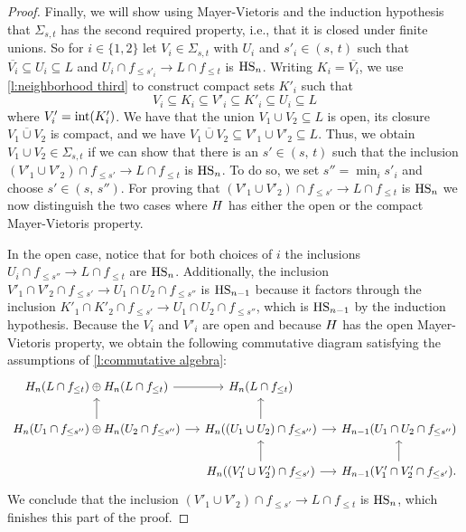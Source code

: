 \begin{proof}
	Finally, we will show using Mayer-Vietoris and the induction hypothesis that $\Sigma_{s,t}$ has the second required property, i.e., that it is closed under finite unions. 
	So for $i \in \{1, 2\}$ let $V_i \in \Sigma_{s,t}$ with $U_i$ and $s'_i \in (s,\, t)$ such that 
	$\overline{V_i} \subseteq U_i \subseteq L$ 
	and
	$U_{i} \cap f_{\leq s'_i} \to L \cap f_{\leq t}$
	is $\mathrm{HS}_n$.
	Writing $K_i = \overline{V_i}$, we use \cref{l:neighborhood third} to construct compact sets $K'_i$ such that
	\[V_i \subseteq K_i \subseteq V'_i \subseteq K'_i \subseteq U_i \subseteq L\]
	where $V'_i = \operatorname{int}(K'_i)$.
	We have that the union $V_1 \cup V_2 \subseteq L$ is open, its closure $\overline{V_1 \cup V_2}$ is compact, and we have $\overline{V_1 \cup V_2} \subseteq V'_1 \cup V'_2 \subseteq L$. 
	Thus, we obtain $V_1 \cup V_2 \in \Sigma_{s,t}$ if we can show that there is an $s' \in (s,\, t)$ such that the inclusion 
	$\left(V'_1 \cup V'_2 \right) \cap f_{\leq s'} \to L \cap f_{\leq t}$
	is $\mathrm{HS}_n$. 
	To do so, we set $s'' = \min_i s'_i$ and choose $s' \in (s,\, s'')$. 
	For proving that $\left(V'_1 \cup V'_2 \right) \cap f_{\leq s'} \to L \cap f_{\leq t}$ is $\mathrm{HS}_n$ we now distinguish the two cases where $H$ has either the open or the compact Mayer-Vietoris property. 
	
	In the open case, notice that for both choices of $i$ the inclusions
	$U_i \cap f_{\leq s''} \to L \cap f_{\leq t}$
	are $\mathrm{HS}_n$.
	Additionally, the inclusion
	$V'_1 \cap V'_2 \cap f_{\leq s'} \to U_1 \cap U_2 \cap f_{\leq s''}$
	is $\mathrm{HS}_{n-1}$ because it factors through the inclusion
	$K'_1 \cap K'_2 \cap f_{\leq s'} \to U_1 \cap U_2 \cap f_{\leq s''}$,
	which is $\mathrm{HS}_{n-1}$ by the induction hypothesis.
    Because the $V_i$ and $V'_i$ are open and because $H$ has the open Mayer-Vietoris property, we obtain the following commutative diagram satisfying the assumptions of \cref{l:commutative algebra}:
	\[
	\begin{tikzcd}[column sep=small]
	\H_n(L \cap f_{\leq t}) \oplus \H_n(L \cap f_{\leq t}) \arrow[r] &
	\H_n(L \cap f_{\leq t}) & \\
	\H_{n}(U_1 \cap f_{\leq s''}) \oplus \H_n(U_2 \cap f_{\leq s''}) \arrow[r] \arrow[u] & 
	\H_{n}((U_1 \cup U_2) \cap f_{\leq s''}) \arrow[r] \arrow[u] &
	\H_{n-1}(U_1 \cap U_2 \cap f_{\leq s''}) \\ & 
	\H_{n}((V'_1 \cup V'_2) \cap f_{\leq s'}) \arrow[r] \arrow[u] &
	\H_{n-1}(V'_1 \cap V'_2 \cap f_{\leq s'}). \arrow[u]
	\end{tikzcd}
	\]
	We conclude that the inclusion 
	$\left(V'_1 \cup V'_2 \right) \cap f_{\leq s'} \to L \cap f_{\leq t}$ 
	is $\mathrm{HS}_n$, which finishes this part of the proof.
	

\end{proof}
